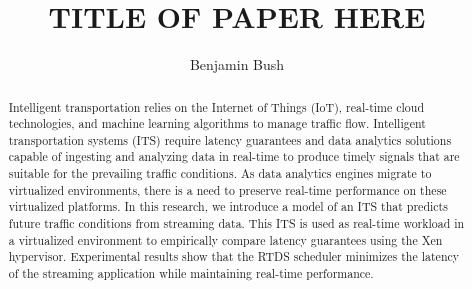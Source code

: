 \documentclass[sigconf]{acmart}
\begin{document}
\title{TITLE OF PAPER HERE}

\author{Benjamin Bush}



\begin{abstract}
Intelligent transportation relies on the Internet of Things (IoT), real-time cloud technologies, and
machine learning algorithms to manage traffic flow. Intelligent transportation systems (ITS)
require latency guarantees and data analytics solutions capable of ingesting and analyzing data in
real-time to produce timely signals that are suitable for the prevailing traffic conditions. As data
analytics engines migrate to virtualized environments, there is a need to preserve real-time
performance on these virtualized platforms. In this research, we introduce a model of an ITS that
predicts future traffic conditions from streaming data. This ITS is used as real-time workload in a
virtualized environment to empirically compare latency guarantees using the Xen hypervisor.
Experimental results show that the RTDS scheduler minimizes the latency of the streaming
application while maintaining real-time performance.
\end{abstract}





\maketitle


\end{document}
